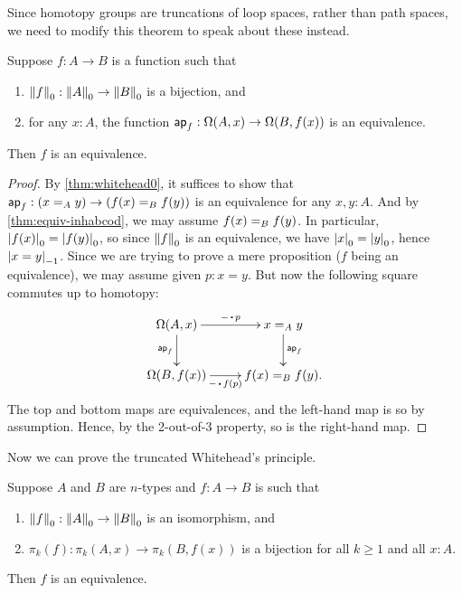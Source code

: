 Since homotopy groups are truncations of loop spaces, rather than path spaces, we need to modify this theorem to speak about these instead.

\begin{cor}\label{thm:whitehead1}
  Suppose $f:A\to B$ is a function such that
  \begin{enumerate}
  \item $\trunc0 f : \trunc0 A \to \trunc0 B$ is a bijection, and
  \item for any $x:A$, the function $\apfunc f : \Omega(A,x) \to \Omega(B,f(x))$ is an equivalence.
  \end{enumerate}
  Then $f$ is an equivalence.
\end{cor}
\begin{proof}
  By \autoref{thm:whitehead0}, it suffices to show that $\apfunc f : (\id[A]xy) \to (\id[B]{f(x)}{f(y)})$ is an equivalence for any $x,y:A$.
  And by \autoref{thm:equiv-inhabcod}, we may assume $\id[B]{f(x)}{f(y)}$.
  In particular, $\tproj0{f(x)} = \tproj0{f(y)}$, so since $\trunc0 f$ is an equivalence, we have $\tproj0 x = \tproj0y$, hence $\tproj{-1}{x=y}$.
  Since we are trying to prove a mere proposition ($f$ being an equivalence), we may assume given $p:x=y$.
  But now the following square commutes up to homotopy:
  \begin{equation*}
  \vcenter{\xymatrix{
      \Omega(A,x)\ar[r]^-{-\ct p}\ar[d]_{\apfunc f} &
      \id[A]xy \ar[d]^{\apfunc f}\\
      \Omega(B,f(x))\ar[r]_-{-\ct f(p)} &
      \id[B]{f(x)}{f(y)}.
      }}
  \end{equation*}
  The top and bottom maps are equivalences, and the left-hand map is so by assumption.
  Hence, by the 2-out-of-3 property, so is the right-hand map.
\end{proof}

Now we can prove the truncated Whitehead's principle.

\begin{thm}\label{thm:whiteheadn}
  Suppose $A$ and $B$ are $n$-types and $f:A\to B$ is such that
  \begin{enumerate}
  \item $\trunc0f:\trunc0A \to \trunc0B$ is an isomorphism, and\label{item:wh0}
  \item $\pi_k(f):\pi_k(A,x) \to \pi_k(B,f(x))$ is a bijection for all $k\ge 1$ and all $x:A$.\label{item:whk}
  \end{enumerate}
  Then $f$ is an equivalence.
\end{thm}

